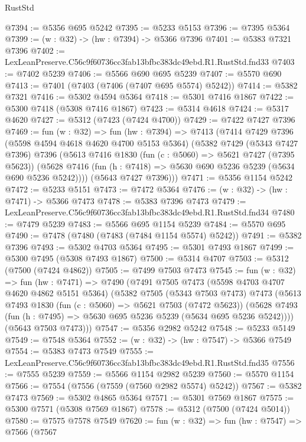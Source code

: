\begin{lexlean}{RustStd}
\begin{coremodule}
@7394 := @5356 @695 @5242
@7395 := @5233 @5153
@7396 := @7395 @5364
@7399 := (w : @32) -> (hw : @7394) -> @5366 @7396
@7401 := @5383 @7321 @7396
@7402 := LexLeanPreserve.C56c9f60736cc3fab13bfbc383dc49ebd.R1.RustStd.fnd33
@7403 := @7402 @5239
@7406 := @5566 @690 @695 @5239
@7407 := @5570 @690
@7413 := @7401 (@7403 (@7406 (@7407 @695 @5574) @5242))
@7414 := @5382 @7321
@7416 := @5302 @4594 @5364
@7418 := @5301 @7416 @1867
@7422 := @5300 @7418 (@5308 @7416 @1867)
@7423 := @5314 @4618
@7424 := @5317 @4620
@7427 := @5312 (@7423 (@7424 @4700))
@7429 := @7422 @7427 @7396
@7469 := fun (w : @32) =>
  fun (hw : @7394) =>
  @7413
    (@7414
      @7429
      @7396
      (@5598 @4594 @4618 @4620 @4700 @5153 @5364)
      (@5382
        @7429
        (@5343 @7427 @7396)
        @7396
        (@5613
          @7416
          @1830
          (fun (c : @5060) => @5621 @7427 (@7395 @5623))
          (@5628 @7416 (fun (h : @7418) => @5630 @690 @5236 @5239 (@5634 @690 @5236 @5242))))
        (@5643 @7427 @7396)))
@7471 := @5356 @1154 @5242
@7472 := @5233 @5151
@7473 := @7472 @5364
@7476 := (w : @32) -> (hw : @7471) -> @5366 @7473
@7478 := @5383 @7396 @7473
@7479 := LexLeanPreserve.C56c9f60736cc3fab13bfbc383dc49ebd.R1.RustStd.fnd34
@7480 := @7479 @5239
@7483 := @5566 @695 @1154 @5239
@7484 := @5570 @695
@7490 := @7478 (@7480 (@7483 (@7484 @1154 @5574) @5242))
@7491 := @5382 @7396
@7493 := @5302 @4703 @5364
@7495 := @5301 @7493 @1867
@7499 := @5300 @7495 (@5308 @7493 @1867)
@7500 := @5314 @4707
@7503 := @5312 (@7500 (@7424 @4862))
@7505 := @7499 @7503 @7473
@7545 := fun (w : @32) =>
  fun (hw : @7471) =>
  @7490
    (@7491
      @7505
      @7473
      (@5598 @4703 @4707 @4620 @4862 @5151 @5364)
      (@5382
        @7505
        (@5343 @7503 @7473)
        @7473
        (@5613
          @7493
          @1830
          (fun (c : @5060) => @5621 @7503 (@7472 @5623))
          (@5628 @7493 (fun (h : @7495) => @5630 @695 @5236 @5239 (@5634 @695 @5236 @5242))))
        (@5643 @7503 @7473)))
@7547 := @5356 @2982 @5242
@7548 := @5233 @5149
@7549 := @7548 @5364
@7552 := (w : @32) -> (hw : @7547) -> @5366 @7549
@7554 := @5383 @7473 @7549
@7555 := LexLeanPreserve.C56c9f60736cc3fab13bfbc383dc49ebd.R1.RustStd.fnd35
@7556 := @7555 @5239
@7559 := @5566 @1154 @2982 @5239
@7560 := @5570 @1154
@7566 := @7554 (@7556 (@7559 (@7560 @2982 @5574) @5242))
@7567 := @5382 @7473
@7569 := @5302 @4865 @5364
@7571 := @5301 @7569 @1867
@7575 := @5300 @7571 (@5308 @7569 @1867)
@7578 := @5312 (@7500 (@7424 @5014))
@7580 := @7575 @7578 @7549
@7620 := fun (w : @32) =>
  fun (hw : @7547) =>
  @7566
    (@7567

\end{coremodule}
\end{lexlean}
